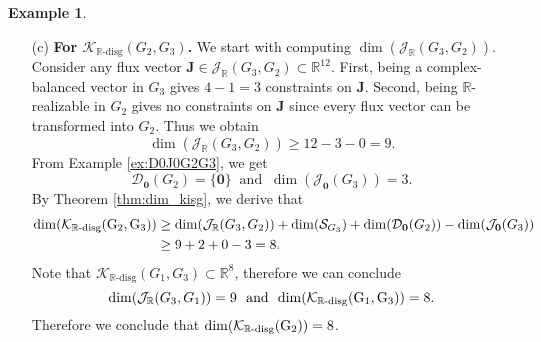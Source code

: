 \documentclass[11pt]{article}
\theoremstyle{plain}
\theoremstyle{definition}
\newtheorem{example}[theorem]{Example}
\theoremstyle{remark}
\newcommand\RR{\mathbb{R}}
\newcommand\bJ{\boldsymbol{J}}
\newcommand{\dK}{\mathcal{K}_{\RR\text{-disg}}}
\newcommand{\mJ}{\mathcal{J}_{\RR}}
\newcommand{\eJ}{\mathcal{J}_{\textbf{0}}}
\newcommand{\mD}{\mathcal{D}_{\textbf{0}}}
\begin{document}
\begin{example}
\begin{enumerate}
We start with computing $\dim (\mJ(G_3, G_1))$.
Consider any flux vector $\bJ \in \mJ(G_3, G_1) \subset \RR^{12}$.
First, being a complex-balanced vector in $G_3$ gives $4-1=3$ constraints on $\bJ$. 
Second, being $\RR$-realizable in $G_1$ gives $4$ constraints (one constraint for each vertex) on $\bJ$.
Thus we obtain 
\[
\dim (\mJ(G_3, G_1)) \geq 12 - 4 - 3 = 5.
\]
From Example \ref{ex:D0J0G2G3} and checking graph $G_1$, we get 
\[
\mD (G_1) = \{ \mathbf{0} \}
\ \text{ and } \
\dim (\eJ(G_3)) =  3.
\]
By Theorem \ref{thm:dim_kisg}, we derive that
\begin{equation}
\begin{split} \notag
\rm{dim}(\dK(G_1, G_3)) 
& \geq \dim (\mJ(G_3, G_1)) + \dim (\mathcal{S}_{G_3}) + \dim(\mD (G_1)) - \dim(\eJ (G_3)) 
\\& \geq 5 + 2 + 0 - 3 = 4.
\end{split}
\end{equation}
Note that $\dK(G_1, G_3) \subset \RR^4$, therefore we can conclude
\[
\dim (\mJ(G_3, G_1)) = 5
\ \text{ and } \
\rm{dim}(\dK(G_1, G_3)) = 4.
\]
Therefore we conclude that $\rm{dim}(\dK(G_1)) = 4$.


\item[(c)] \textbf{For $\dK(G_2, G_3)$.}
We start with computing $\dim (\mJ(G_3, G_2))$.
Consider any flux vector $\bJ \in \mJ(G_3, G_2) \subset \RR^{12}$.
First, being a complex-balanced vector in $G_3$ gives $4-1=3$ constraints on $\bJ$. 
Second, being $\RR$-realizable in $G_2$ gives no constraints on $\bJ$ since every flux vector can be transformed into $G_2$.
Thus we obtain 
\[
\dim (\mJ(G_3, G_2)) \geq 12 - 3 - 0 = 9.
\]
From Example \ref{ex:D0J0G2G3}, we get 
\[
\mD (G_2) = \{ \mathbf{0} \}
\ \text{ and } \
\dim (\eJ(G_3)) =  3.
\]
By Theorem \ref{thm:dim_kisg}, we derive that
\begin{equation}
\begin{split} \notag
\rm{dim}(\dK(G_2, G_3)) 
& \geq \dim (\mJ(G_3, G_2)) + \dim (\mathcal{S}_{G_3}) + \dim(\mD (G_2)) - \dim(\eJ (G_3)) 
\\& \geq 9 + 2 + 0 - 3 = 8.
\end{split}
\end{equation}
Note that $\dK(G_1, G_3) \subset \RR^8$, therefore we can conclude
\[
\dim (\mJ(G_3, G_1)) = 9
\ \text{ and } \
\rm{dim}(\dK(G_1, G_3)) = 8.
\]
Therefore we conclude that $\rm{dim}(\dK(G_2)) = 8$.



\end{enumerate}
\end{example}
\end{document}
